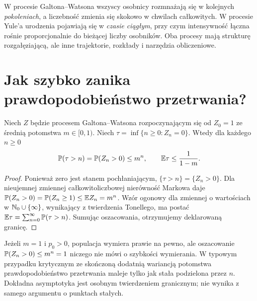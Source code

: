 \begin{uwaga}
W procesie Galtona--Watsona wszyscy osobnicy rozmnażają się
w kolejnych \emph{pokoleniach}, a liczebność zmienia się
skokowo w chwilach całkowitych. W procesie Yule'a
urodzenia pojawiają się w \emph{czasie ciągłym}, przy czym
intensywność łączna rośnie proporcjonalnie do bieżącej liczby
osobników. Oba procesy mają strukturę rozgałęziającą,
ale inne trajektorie, rozkłady i narzędzia obliczeniowe.
\end{uwaga}


\section{Jak szybko zanika prawdopodobieństwo przetrwania?}
\begin{stwierdzenie}
Niech $Z$ będzie procesem Galtona--Watsona rozpoczynającym się
od $Z_0=1$ ze średnią potomstwa $m\in[0,1)$.
Niech $\tau=\inf\{n\ge0:Z_n=0\}$.
Wtedy dla każdego $n\ge0$
\[
\mathbb{P}(\tau>n)=\mathbb{P}(Z_n>0)\le m^n,
\qquad \mathbb{E}\tau\le\frac{1}{1-m}.
\]
\end{stwierdzenie}
\begin{proof}
Ponieważ zero jest stanem pochłaniającym,
$\{\tau>n\}=\{Z_n>0\}$. Dla nieujemnej zmiennej
całkowitoliczbowej nierówność Markowa daje
$\mathbb{P}(Z_n>0)=\mathbb{P}(Z_n\ge1)\le\mathbb{E} Z_n=m^n$.
Wzór ogonowy dla zmiennej o wartościach w $\mathbb{N}_0\cup\{\infty\}$,
wynikający z twierdzenia Tonellego, ma postać
$\mathbb{E}\tau=\sum_{n=0}^\infty\mathbb{P}(\tau>n)$.
Sumując oszacowania, otrzymujemy deklarowaną granicę.
\end{proof}

\begin{uwaga}
Jeżeli $m=1$ i $p_0>0$, populacja wymiera prawie na pewno,
ale oszacowanie $\mathbb{P}(Z_n>0)\le m^n=1$ niczego nie mówi
o szybkości wymierania. W typowym przypadku krytycznym
ze skończoną dodatnią wariancją potomstwa prawdopodobieństwo
przetrwania maleje tylko jak stała podzielona przez $n$.
Dokładna asymptotyka jest osobnym twierdzeniem granicznym;
nie wynika z samego argumentu o punktach stałych.
\end{uwaga}

